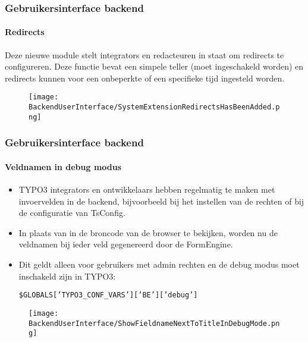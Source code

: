 
\begin{frame}[fragile]
	\frametitle{Gebruikersinterface backend}
	\framesubtitle{Redirects}

	Deze nieuwe module stelt integrators en redacteuren in staat om redirects te configureren.
	Deze functie bevat een simpele teller (moet ingeschakeld worden) en
	redirects kunnen voor een onbeperkte of een specifieke tijd ingesteld worden.

	\begin{figure}
		\texttt{[image: BackendUserInterface/SystemExtensionRedirectsHasBeenAdded.png]}
	\end{figure}

\end{frame}


\begin{frame}[fragile]
	\frametitle{Gebruikersinterface backend}
	\framesubtitle{Veldnamen in debug modus}

	\begin{itemize}

		\item TYPO3 integrators en ontwikkelaars hebben regelmatig te maken met invoervelden in de backend,
			bijvoorbeeld bij het instellen van de rechten of bij de configuratie van TsConfig.

		\item In plaats van in de broncode van de browser te bekijken, worden nu de veldnamen bij ieder veld
		    gegenereerd door de FormEngine.

		\item Dit geldt alleen voor gebruikers met admin rechten en de debug modus moet inschakeld zijn in TYPO3:

			\smaller
				\texttt{\$GLOBALS['TYPO3\_CONF\_VARS']['BE']['debug']}
			\normalsize

	\end{itemize}

	\begin{figure}
		\texttt{[image: BackendUserInterface/ShowFieldnameNextToTitleInDebugMode.png]}
	\end{figure}

\end{frame}

